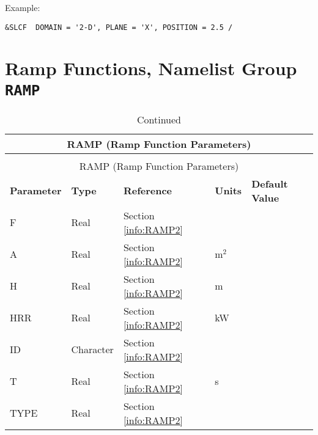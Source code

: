 \noindent Example:
\begin{lstlisting}
&SLCF  DOMAIN = '2-D', PLANE = 'X', POSITION = 2.5 /
\end{lstlisting}




\clearpage
\section{Ramp Functions, Namelist Group \texorpdfstring{{\tt RAMP}}{RAMP}}
\label{info:RAMP}
\label{info:RAMP2}

\vspace{\baselineskip}
\begin{longtable}{@{\extracolsep{\fill}}|l|l|l|l|l|}
\caption[Ramp Function Parameters ({\ct RAMP} namelist group)]{For more information see Section~\ref{info:RAMP}.}
\label{tbl:RAMP} \\
\hline
\multicolumn{5}{|c|}{{\ct RAMP} (Ramp Function Parameters)} \\
\hline \hline
\endfirsthead
\caption[]{Continued} \\
\hline
\multicolumn{5}{|c|}{{\ct RAMP} (Ramp Function Parameters)} \\
\hline \hline
\endhead
\parbox{1.5in}{\bf Parameter}    & \parbox{1in}{\bf Type}  & \parbox{1in}{\bf Reference}  & \parbox{1in}{\bf Units}  & \parbox{1in}{\bf Default Value} \\ \hline
{\ct F}               & Real        & Section \ref{info:RAMP2}                 &           &                 \\ \hline
{\ct A}               & Real        & Section \ref{info:RAMP2}                 &  m$^2$         &                 \\ \hline
{\ct H}               & Real        & Section \ref{info:RAMP2}                 &  m         &                 \\ \hline
{\ct HRR}             & Real        & Section \ref{info:RAMP2}                 & kW         &                 \\ \hline
{\ct ID}      	      & Character   & Section \ref{info:RAMP2}                 &           &                 \\ \hline
{\ct T}               & Real        & Section \ref{info:RAMP2}                 &  s        &                 \\ \hline
{\ct TYPE}                & Real        & Section \ref{info:RAMP2}                 &          &                 \\ \hline
\end{longtable}


